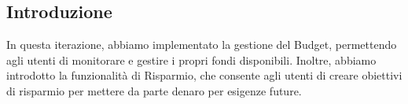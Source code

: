 \subsection{Introduzione}

In questa iterazione, abbiamo implementato la gestione del Budget, permettendo agli utenti di monitorare e gestire i propri fondi disponibili. Inoltre, abbiamo introdotto la funzionalità di Risparmio, che consente agli utenti di creare obiettivi di risparmio per mettere da parte denaro per esigenze future.
